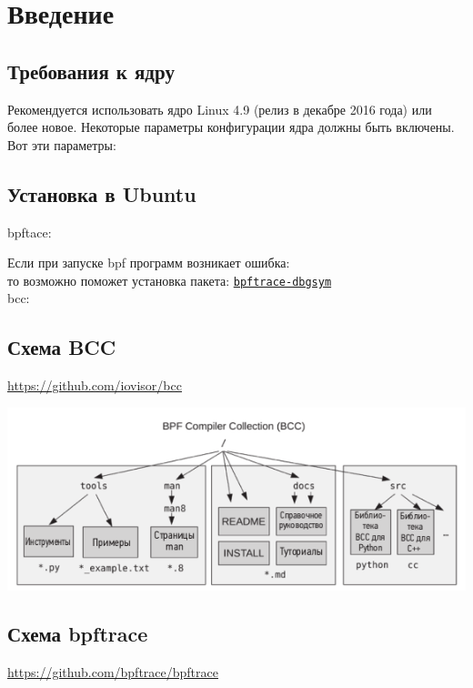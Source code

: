 \section{Введение}

\subsection{Требования к ядру}
Рекомендуется использовать ядро Linux 4.9 (релиз в декабре 2016 года) или более
новое. Некоторые параметры конфигурации ядра должны быть включены.
Вот эти параметры: \\

\subsection{Установка в Ubuntu}

\noindent bpftace: \\

\noindent Если при запуске bpf программ возникает ошибка: \\
то возможно поможет установка пакета: 
\href{https://ubuntu.com/server/docs/debug-symbol-packages}{\texttt{bpftrace-dbgsym}} \\

\noindent bcc: \\


\subsection{Схема BCC}
\url{https://github.com/iovisor/bcc}

\includegraphics[width=0.8\linewidth]{structure_bcc.png}

\subsection{Схема bpftrace}
\url{https://github.com/bpftrace/bpftrace}

